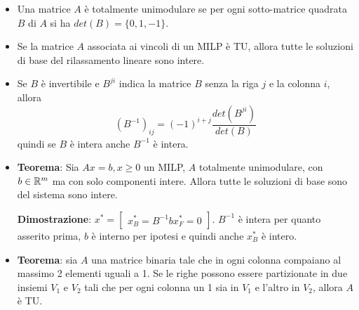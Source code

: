 \begin{itemize}
	\item Una matrice $A$ è totalmente unimodulare se per ogni sotto-matrice quadrata $B$ di $A$ si ha $det(B) = \{0, 1, -1\}$.
	\item Se la matrice $A$ associata ai vincoli di un MILP è TU, allora tutte le soluzioni di base del rilassamento lineare sono intere.
	\item Se $B$ è invertibile e $B^{ji}$ indica la matrice $B$ senza la riga $j$ e la colonna $i$, allora
	$$
	(B^{-1})_{ij} = (-1)^{i+j} \frac{det(B^{ji})}{det(B)}
	$$	
	quindi se $B$ è intera anche $B^{-1}$ è intera.
	\item \textbf{Teorema}: Sia $Ax = b, x\geq 0$ un MILP, $A$ totalmente unimodulare, con $b \in \mathbb{R}^m$ ma con solo componenti intere. Allora tutte le soluzioni di base sono del sistema sono intere. 
	
	\textbf{Dimostrazione}: $x^* = \begin{bmatrix} x_{B}^* = B^{-1}b
	x_{F}^* = 0
	\end{bmatrix}$. $B^{-1}$ è intera per quanto asserito prima, $b$ è interno per ipotesi e quindi anche $x_{B}^*$ è intero.
	
	\item \textbf{Teorema}: sia $A$ una matrice binaria tale che in ogni colonna compaiano al massimo 2 elementi uguali a 1. Se le righe possono essere partizionate in due insiemi $V_1$ e $V_2$ tali che per ogni colonna un 1 sia in $V_1$ e l'altro in $V_2$, allora $A$ è TU.
	

\end{itemize}
